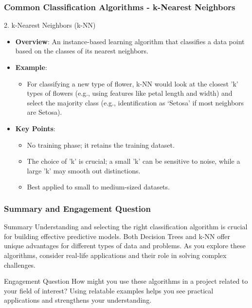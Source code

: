 \documentclass[aspectratio=169]{beamer}
\begin{document}
\begin{frame}[fragile]
    \frametitle{Common Classification Algorithms - k-Nearest Neighbors}
    \begin{block}{2. k-Nearest Neighbors (k-NN)}
        \begin{itemize}
            \item \textbf{Overview}: An instance-based learning algorithm that classifies a data point based on the classes of its nearest neighbors.
            \item \textbf{Example}: 
            \begin{itemize}
                \item For classifying a new type of flower, k-NN would look at the closest 'k' types of flowers (e.g., using features like petal length and width) and select the majority class (e.g., identification as ‘Setosa’ if most neighbors are Setosa).
            \end{itemize}
            \item \textbf{Key Points}:
            \begin{itemize}
                \item No training phase; it retains the training dataset.
                \item The choice of 'k' is crucial; a small 'k' can be sensitive to noise, while a large 'k' may smooth out distinctions.
                \item Best applied to small to medium-sized datasets.
            \end{itemize}
        \end{itemize}
    \end{block}
\end{frame}

\begin{frame}[fragile]
    \frametitle{Summary and Engagement Question}
    \begin{block}{Summary}
        Understanding and selecting the right classification algorithm is crucial for building effective predictive models. 
        Both Decision Trees and k-NN offer unique advantages for different types of data and problems. 
        As you explore these algorithms, consider real-life applications and their role in solving complex challenges.
    \end{block}

    \begin{block}{Engagement Question}
        How might you use these algorithms in a project related to your field of interest?
        Using relatable examples helps you see practical applications and strengthens your understanding.
    \end{block}
\end{frame}
\end{document}
